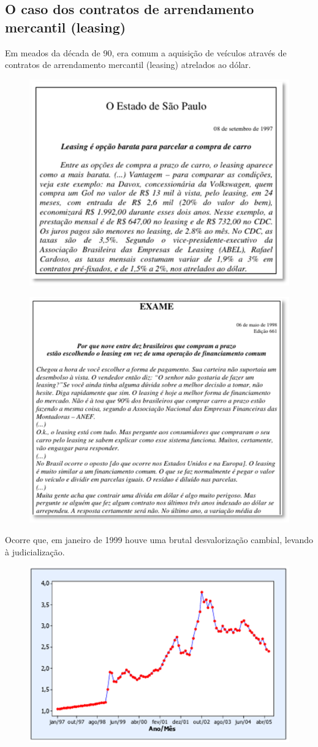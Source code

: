 \documentclass[a4paper,12pt]{article}[abntex2]
\begin{document}
\subsection{\textbf{O caso dos contratos de arrendamento mercantil (leasing)}}
Em meados da década de 90, era comum a aquisição de veículos através de contratos de arrendamento mercantil (leasing) atrelados ao dólar.

\begin{figure}[H]
    \centering
    \includegraphics[width=0.5\linewidth]{Imagens/a10i2.png}
\end{figure}

\begin{figure}[H]
    \centering
    \includegraphics[width=0.5\linewidth]{Imagens/a10i3.png}
\end{figure}

Ocorre que, em janeiro de 1999 houve uma brutal desvalorização cambial, levando à judicialização.

\begin{figure}[H]
    \centering
    \includegraphics[width=0.5\linewidth]{Imagens/a10i4.png}
\end{figure}
\end{document}
